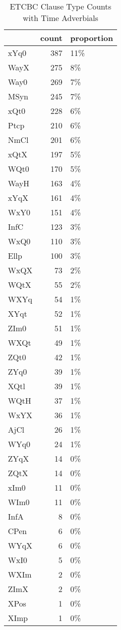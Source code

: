 \begin{table}[htbp!]
\centering
\caption{ETCBC Clause Type Counts with Time Adverbials}
\label{table:cltype_cts}
\begin{tabular}{lrl}
\toprule
{} &  count & proportion \\
\midrule
xYq0 &    387 &        11\% \\
WayX &    275 &         8\% \\
Way0 &    269 &         7\% \\
MSyn &    245 &         7\% \\
xQt0 &    228 &         6\% \\
Ptcp &    210 &         6\% \\
NmCl &    201 &         6\% \\
xQtX &    197 &         5\% \\
WQt0 &    170 &         5\% \\
WayH &    163 &         4\% \\
xYqX &    161 &         4\% \\
WxY0 &    151 &         4\% \\
InfC &    123 &         3\% \\
WxQ0 &    110 &         3\% \\
Ellp &    100 &         3\% \\
WxQX &     73 &         2\% \\
WQtX &     55 &         2\% \\
WXYq &     54 &         1\% \\
XYqt &     52 &         1\% \\
ZIm0 &     51 &         1\% \\
WXQt &     49 &         1\% \\
ZQt0 &     42 &         1\% \\
ZYq0 &     39 &         1\% \\
XQtl &     39 &         1\% \\
WQtH &     37 &         1\% \\
WxYX &     36 &         1\% \\
AjCl &     26 &         1\% \\
WYq0 &     24 &         1\% \\
ZYqX &     14 &         0\% \\
ZQtX &     14 &         0\% \\
xIm0 &     11 &         0\% \\
WIm0 &     11 &         0\% \\
InfA &      8 &         0\% \\
CPen &      6 &         0\% \\
WYqX &      6 &         0\% \\
WxI0 &      5 &         0\% \\
WXIm &      2 &         0\% \\
ZImX &      2 &         0\% \\
XPos &      1 &         0\% \\
XImp &      1 &         0\% \\
\bottomrule
\end{tabular}
\end{table}
